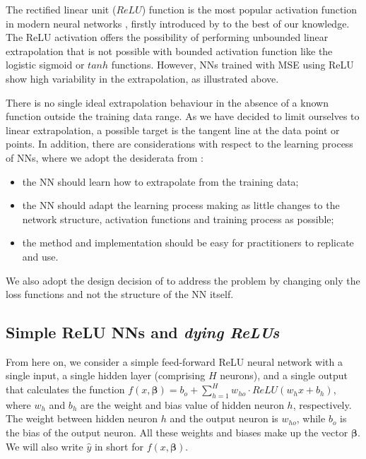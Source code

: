 \documentclass[runningheads]{llncs}
\begin{document}
The rectified linear unit ($ReLU$) function is the most popular activation function in modern neural networks \cite{goodfellow2016deep}, firstly introduced by \cite{fukushima1975relu} to the best of our knowledge. 
The ReLU activation offers the possibility of performing unbounded linear extrapolation that is not possible with bounded activation function like the logistic sigmoid or $tanh$ functions. 
However, NNs trained with MSE using ReLU show high variability in the extrapolation, as illustrated above.

There is no single ideal extrapolation behaviour in the absence of a known function outside the training data range. 
As we have decided to limit ourselves to linear extrapolation, a possible target is the tangent line at the data point or points. 
In addition, there are considerations with respect to the learning process of NNs, where we adopt the desiderata from \cite{Lopedoto20}: 
\begin{itemize}
 \item the NN should learn how to extrapolate from the training data;
 \item the NN should adapt the learning process making as little changes to the network structure, activation functions and training process as possible;
 \item the method and implementation should be easy for practitioners to replicate and use.
\end{itemize}
We also adopt the design decision of \cite{Lopedoto20} to address the problem by changing only the loss functions and not the structure of the NN itself. 

\subsection{Simple ReLU NNs and \emph{dying ReLUs}}

From here on, we consider a simple feed-forward ReLU neural network with a single input, a single hidden layer (comprising $H$ neurons), and a single output that calculates the function
$f(x,\boldsymbol{\beta}) =
b_{o} +\sum^{H}_{h=1} w_{ho} \cdot ReLU(w_{h} x + b_{h}) $, where $w_{h}$ and ${b}_{h}$ are the weight and bias value of hidden neuron $h$, respectively. 
The weight between hidden neuron $h$ and the output neuron is $w_{ho}$, while $b_{o}$ is the bias of the output neuron. All these weights and biases make up the vector $\boldsymbol{\beta}$. 
We will also write $\hat{y}$ in short for $f(x,\boldsymbol{\beta})$.
\end{document}
